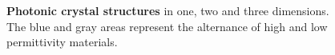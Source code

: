 \begin{figure}[h!]
{
}

\caption[Photonic crystal structures]{\textbf{Photonic crystal structures} in one, two and three dimensions. The blue and gray areas represent the alternance of high and low permittivity materials.}
\label{fig:cristaux}
\end{figure}
